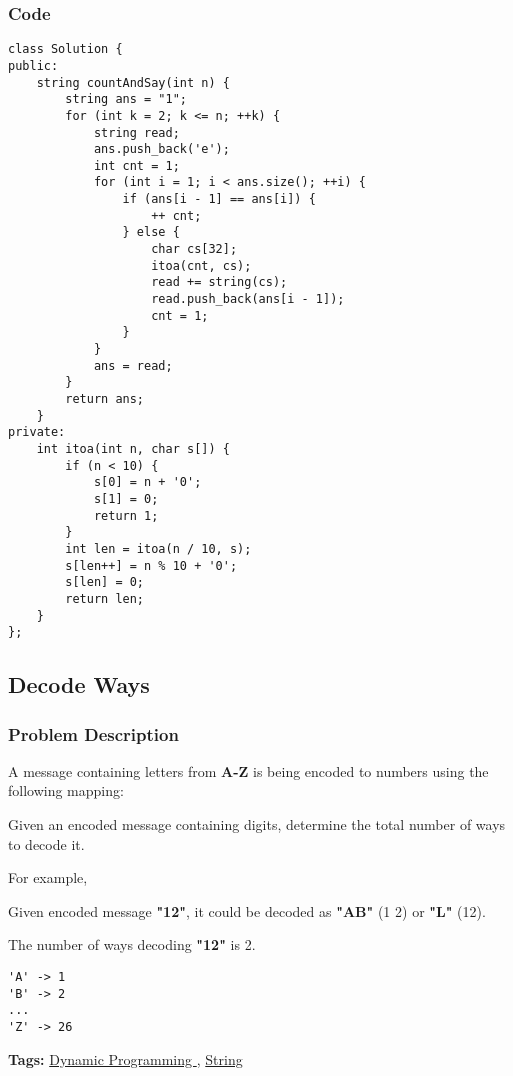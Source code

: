 \documentclass{article}
\begin{document}
\begin{CJK*}{UTF8}{gkai}
\subsubsection*{Code}
\begin{lstlisting}
class Solution {
public:
    string countAndSay(int n) {
        string ans = "1";
        for (int k = 2; k <= n; ++k) {
            string read;
            ans.push_back('e');
            int cnt = 1;
            for (int i = 1; i < ans.size(); ++i) {
                if (ans[i - 1] == ans[i]) {
                    ++ cnt;
                } else {
                    char cs[32];
                    itoa(cnt, cs);
                    read += string(cs);
                    read.push_back(ans[i - 1]);
                    cnt = 1;
                }
            }
            ans = read;
        }
        return ans;
    }
private:
    int itoa(int n, char s[]) {
        if (n < 10) {
            s[0] = n + '0';
            s[1] = 0;
            return 1;
        }
        int len = itoa(n / 10, s);
        s[len++] = n % 10 + '0';
        s[len] = 0;
        return len;
    }
}; 
\end{lstlisting}


\subsection{ Decode Ways }
\label{ Decode Ways }

\subsubsection*{Problem Description}
A message containing letters from \textbf{A-Z} is being encoded to numbers using the following mapping:

Given an encoded message containing digits, determine the total number of ways to decode it.

For example,


Given encoded message \textbf{"12"},
it could be decoded as \textbf{"AB"} (1 2) or \textbf{"L"} (12).

The number of ways decoding \textbf{"12"} is 2.

\begin{verbatim}
'A' -> 1
'B' -> 2
...
'Z' -> 26
\end{verbatim}

\textbf{Tags: }
\hyperref[ Dynamic Programming ]{ Dynamic Programming },  \hyperref[ String ]{ String }




\end{CJK*}
\end{document}
